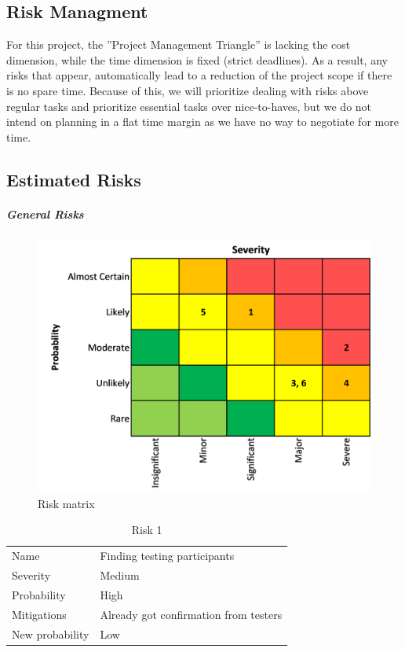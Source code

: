 \subsection{Risk Managment}
For this project, the ”Project Management Triangle” is lacking the cost dimension, while the time dimension is fixed (strict deadlines). As a result, any risks that appear, automatically lead to a reduction of the project scope if there is no spare time. Because of this, we will prioritize dealing with risks above regular tasks and prioritize essential tasks over nice-to-haves, but we do not intend on planning in a flat time margin as we have no way to negotiate for more time.

\subsection{Estimated Risks}

\subparagraph{General Risks}

\begin{figure}[H]
  \includegraphics[width=\linewidth]{resources/risks-matrix.png}
  \caption{Risk matrix}
  \label{risk_matrix}
\end{figure}

\begin{table}
  \centering
  \caption{Risk 1}
  \begin{tabular}{ll}
    Name            & Finding testing participants           \\
    Severity        & Medium                                 \\
    Probability     & High                                   \\
    Mitigations     & Already got confirmation from testers  \\
    New probability & Low                                   
  \end{tabular}
\end{table}

